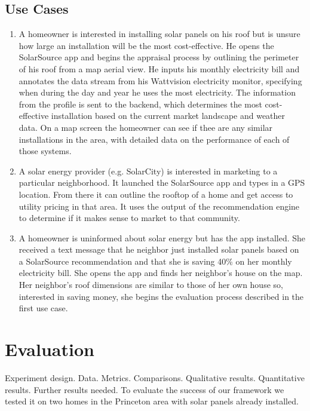 \documentclass[pageno]{jpaper}
\begin{document}
\subsection{Use Cases}
\begin{enumerate} 
\item A homeowner is interested in installing solar panels on his roof but is unsure how large an installation will be the most cost-effective. He opens the SolarSource app and begins the appraisal process by outlining the perimeter of his roof from a map aerial view. He inputs his monthly electricity bill and annotates the data stream from his Wattvision electricity monitor, specifying when during the day and year he uses the most electricity. The information from the profile is sent to the backend, which determines the most cost-effective installation based on the current market landscape and weather data. On a map screen the homeowner can see if thee are any similar installations in the area, with detailed data on the performance of each of those systems. 

\item A solar energy provider (e.g. SolarCity) is interested in marketing to a particular neighborhood. It launched the SolarSource app and types in a GPS location. From there it can outline the rooftop of a home and get access to utility pricing in that area. It uses the output of the recommendation engine to determine if it makes sense to market to that community.

\item A homeowner is uninformed about solar energy but has the app installed. She received a text message that he neighbor just installed solar panels based on a SolarSource recommendation and that she is saving 40\% on her monthly electricity bill. She opens the app and finds her neighbor's house on the map. Her neighbor's roof dimensions are similar to those of her own house so, interested in saving money, she begins the evaluation process described in the first use case.
\end{enumerate}

\section{Evaluation}
Experiment design.  Data.  Metrics. Comparisons. Qualitative results.  Quantitative results.  Further results needed.
To evaluate the success of our framework we tested it on two homes in the Princeton area with solar panels already installed.
\end{document}
